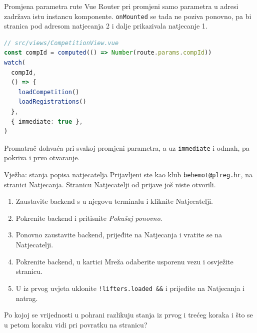 \begin{frame}[fragile]{Promjena parametra rute}
Vue Router pri promjeni samo parametra u adresi zadržava istu instancu komponente. \texttt{onMounted} se tada ne poziva ponovno, pa bi stranica pod adresom natjecanja 2 i dalje prikazivala natjecanje 1.

\begin{lstlisting}[language=typescript]
// src/views/CompetitionView.vue
const compId = computed(() => Number(route.params.compId))
watch(
  compId,
  () => {
    loadCompetition()
    loadRegistrations()
  },
  { immediate: true },
)
\end{lstlisting}

\vspace{0.2em}
Promatrač dohvaća pri svakoj promjeni parametra, a uz \texttt{immediate} i odmah, pa pokriva i prvo otvaranje.
\end{frame}

\begin{frame}{Vježba: stanja popisa natjecatelja}
Prijavljeni ste kao klub \texttt{behemot@plreg.hr}, na stranici Natjecanja. Stranicu Natjecatelji od prijave još niste otvorili.

\vspace{0.8em}
\begin{enumerate}
  \itemsep0.4em
  \item Zaustavite backend s  u njegovu terminalu i kliknite Natjecatelji.
  \item Pokrenite backend i pritisnite \emph{Pokušaj ponovno}.
  \item Ponovno zaustavite backend, prijeđite na Natjecanja i vratite se na Natjecatelji.
  \item Pokrenite backend, u kartici Mreža odaberite usporenu vezu i osvježite stranicu.
  \item U  iz prvog uvjeta uklonite \texttt{!lifters.loaded \&\&} i prijeđite na Natjecanja i natrag.
\end{enumerate}

\vspace{0.8em}
Po kojoj se vrijednosti u pohrani razlikuju stanja iz prvog i trećeg koraka i što se u petom koraku vidi pri povratku na stranicu?
\end{frame}


